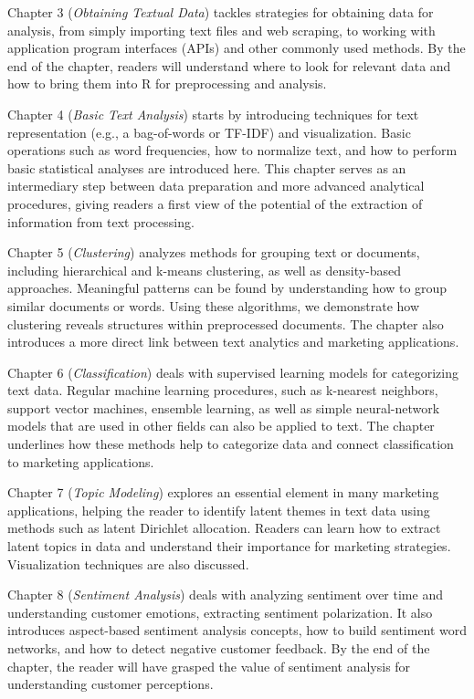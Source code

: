 Chapter 3 (\emph{Obtaining Textual Data}) tackles strategies for obtaining data for analysis, from simply importing text files and web scraping, to working with application program interfaces (APIs) and other commonly used methods. By the end of the chapter, readers will understand where to look for relevant data and how to bring them into R for preprocessing and analysis.

Chapter 4 (\emph{Basic Text Analysis}) starts by introducing techniques for text representation (e.g., a bag-of-words or TF-IDF) and visualization. Basic operations such as word frequencies, how to normalize text, and how to perform basic statistical analyses are introduced here. This chapter serves as an intermediary step between data preparation and more advanced analytical procedures, giving readers a first view of the potential of the extraction of information from text processing.

Chapter 5 (\emph{Clustering}) analyzes methods for grouping text or documents, including hierarchical and k-means clustering, as well as density-based approaches. Meaningful patterns can be found by understanding how to group similar documents or words. Using these algorithms, we demonstrate how clustering reveals structures within preprocessed documents. The chapter also introduces a more direct link between text analytics and marketing applications.

Chapter 6 (\emph{Classification}) deals with supervised learning models for categorizing text data. Regular machine learning procedures, such as k-nearest neighbors, support vector machines, ensemble learning, as well as simple neural-network models that are used in other fields can also be applied to text. The chapter underlines how these methods help to categorize data and connect classification to marketing applications.

Chapter 7 (\emph{Topic Modeling}) explores an essential element in many marketing applications, helping the reader to identify latent themes in text data using methods such as latent Dirichlet allocation. Readers can learn how to extract latent topics in data and understand their importance for marketing strategies. Visualization techniques are also discussed.

Chapter 8 (\emph{Sentiment Analysis}) deals with analyzing sentiment over time and understanding customer emotions, extracting sentiment polarization. It also introduces aspect-based sentiment analysis concepts, how to build sentiment word networks, and how to detect negative customer feedback. By the end of the chapter, the reader will have grasped the value of sentiment analysis for understanding customer perceptions.


